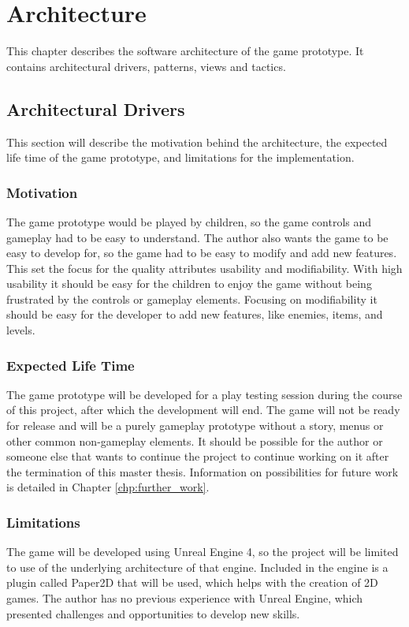 \chapter{Architecture}
This chapter describes the software architecture of the game prototype. It contains architectural drivers, patterns, views and tactics.

\section{Architectural Drivers}
This section will describe the motivation behind the architecture, the expected life time of the game prototype, and limitations for the implementation.

\subsection{Motivation}
The game prototype would be played by children, so the game controls and gameplay had to be easy to understand. The author also wants the game to be easy to develop for, so the game had to be easy to modify and add new features. This set the focus for the quality attributes usability and modifiability. With high usability it should be easy for the children to enjoy the game without being frustrated by the controls or gameplay elements. Focusing on modifiability it should be easy for the developer to add new features, like enemies, items, and levels.

\subsection{Expected Life Time}
The game prototype will be developed for a play testing session during the course of this project, after which the development will end. The game will not be ready for release and will be a purely gameplay prototype without a story, menus or other common non-gameplay elements. It should be possible for the author or someone else that wants to continue the project to continue working on it after the termination of this master thesis. Information on possibilities for future work is detailed in Chapter \ref{chp:further_work}.

\subsection{Limitations}
The game will be developed using Unreal Engine 4, so the project will be limited to use of the underlying architecture of that engine. Included in the engine is a plugin called Paper2D that will be used, which helps with the creation of 2D games. The author has no previous experience with Unreal Engine, which presented challenges and opportunities to develop new skills. 


